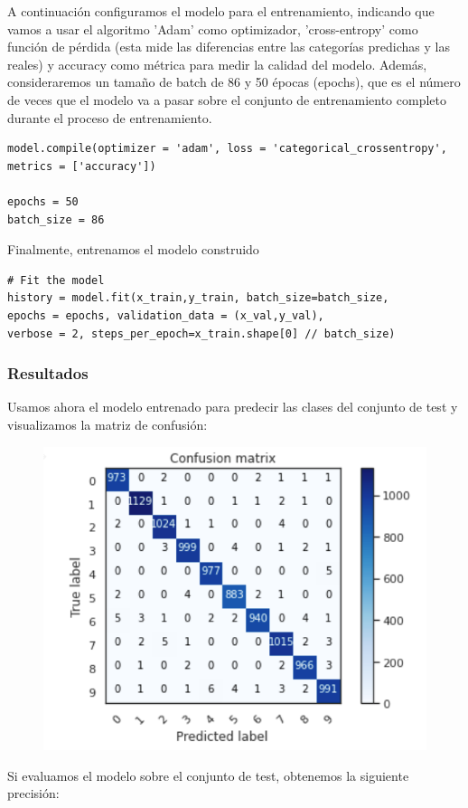 \documentclass[a4paper,11pt]{article}
\begin{document}
 A continuación configuramos el modelo para el entrenamiento, indicando que vamos a usar el algoritmo 'Adam' como optimizador, 'cross-entropy' como función de pérdida (esta mide las diferencias entre las categorías predichas y las reales) y accuracy como métrica para medir la calidad del modelo. Además, consideraremos un tamaño de batch de 86 y 50 épocas (epochs), que es el número de veces que el modelo va a pasar sobre el conjunto de entrenamiento completo durante el proceso de entrenamiento. 
\begin{verbatim}
model.compile(optimizer = 'adam', loss = 'categorical_crossentropy',
metrics = ['accuracy'])

epochs = 50 
batch_size = 86
\end{verbatim}
Finalmente, entrenamos el modelo construido
\begin{verbatim}
# Fit the model
history = model.fit(x_train,y_train, batch_size=batch_size,
epochs = epochs, validation_data = (x_val,y_val),
verbose = 2, steps_per_epoch=x_train.shape[0] // batch_size)
\end{verbatim}
\subsubsection{Resultados}

Usamos ahora el modelo entrenado para predecir las clases del conjunto de test y visualizamos la matriz de confusión:
\begin{figure}[H]
	\centering
	\includegraphics[width=0.8\linewidth]{img/confs1}
	\caption{}
	\label{fig:confs1}
\end{figure}

Si evaluamos el modelo sobre el conjunto de test, obtenemos la siguiente precisión: 
\end{document}
